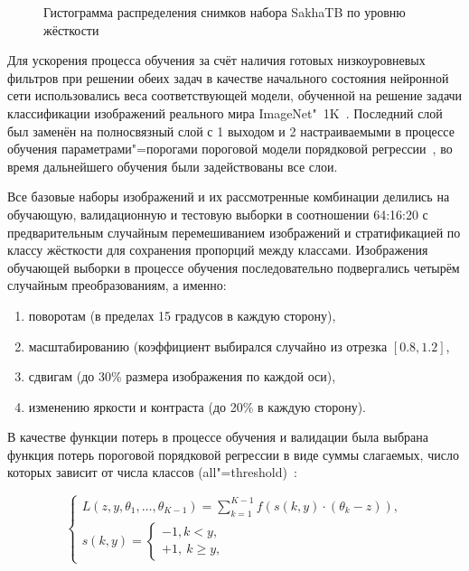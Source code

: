 \begin{figure}[ht]
	\caption{Гистограмма распределения снимков набора SakhaTB по уровню жёсткости}
	\label{fig:hardness-yak-hardness}
\end{figure}

Для ускорения процесса обучения за счёт наличия готовых низкоуровневых фильтров при решении обеих задач в качестве начального состояния нейронной сети использовались веса соответствующей модели, обученной на решение задачи классификации изображений реального мира ImageNet"~1K~\cite{russakovsky2015imagenet}. Последний слой был заменён на полносвязный слой с 1 выходом и 2 настраиваемыми в процессе обучения параметрами"=порогами пороговой модели порядковой регрессии~\cite{rennie2005loss}, во время дальнейшего обучения были задействованы все слои.

Все базовые наборы изображений и их рассмотренные комбинации делились на обучающую, валидационную и тестовую выборки в соотношении 64:16:20 с предварительным случайным перемешиванием изображений и стратификацией по классу жёсткости для сохранения пропорций между классами. Изображения обучающей выборки в процессе обучения последовательно подвергались четырём случайным преобразованиям, а именно:
\begin{enumerate}[beginpenalty=10000]
	\item поворотам (в пределах 15 градусов в каждую сторону),
	\item масштабированию (коэффициент выбирался случайно из отрезка $\left[ 0.8, 1.2 \right]$,
	\item сдвигам (до 30\% размера изображения по каждой оси),
	\item изменению яркости и контраста (до 20\% в каждую сторону).
\end{enumerate}

В качестве функции потерь в процессе обучения и валидации была выбрана функция потерь пороговой порядковой регрессии в виде суммы слагаемых, число которых зависит от числа классов (all"=threshold)~\cite{rennie2005loss}:

\begin{equation}
	\begin{cases}
		L \left( z, y, \theta_1, \ldots, \theta_{K-1} \right) = \sum_{k=1}^{K-1} f \left( s \left( k, y \right) \cdot \left( \theta_k-z \right) \right), \\
		s \left( k, y \right) =
		\begin{cases}
			-1, k < y, \\
			+1, \ k \geq y,
		\end{cases}
	\end{cases} \nonumber
\end{equation}

